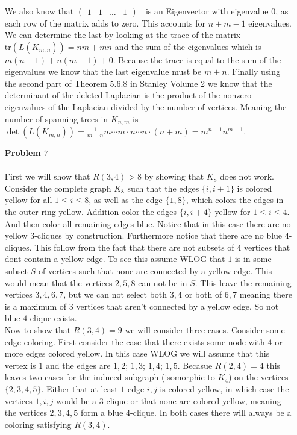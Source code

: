 \documentclass[12pt]{amsart}
\theoremstyle{definition}
\begin{document}
\begin{itemize}[align=left]
We also know that $\begin{pmatrix} 1&1& \dots&1 \end{pmatrix}^\intercal$ is an Eigenvector with eigenvalue $0$, as each row of the matrix adds to zero. This accounts for $n+m-1$ eigenvalues. We can determine the last by looking at the trace of the matrix $\text{tr}( L(K_{m,n}))=nm+mn$ and the sum of the eigenvalues which is $m(n-1)+n(m-1)+0$. Because the trace is equal to the sum of the eigenvalues we know that the last eigenvalue must be $m+n$. Finally using the second part of Theorem 5.6.8 in Stanley Volume 2 we know that the determinant of the deleted Laplacian is the product of the nonzero eigenvalues of the Laplacian divided by the number of vertices. Meaning the number of spanning trees in $K_{n,m}$ is $\det(L(K_{m,n}))=\frac{1}{m+n}m\cdots m\cdot n\cdots n\cdot (n+m)=m^{n-1}n^{m-1}$.\\
    

\item[\textbf{Problem $7$}]\;\\\\ %
First we will show that $R(3,4)>8$ by showing that $K_8$ does not work. Consider the complete graph $K_8$ such that the edges $\{i,i+1\}$ is colored yellow for all $1\leq i\leq 8$, as well as the edge $\{1,8\}$, which colors the edges in the outer ring yellow. Addition color the edges $\{i,i+4\}$ yellow for $1\leq i\leq 4$. And then color all remaining edges blue. Notice that in this case there are no yellow $3$-cliques by construction. Furthermore notice that there are no blue $4$-cliques. This follow from the fact that there are not subsets of $4$ vertices that dont contain a yellow edge. To see this assume WLOG that $1$ is in some subset $S$ of vertices such that none are connected by a yellow edge. This would mean that the vertices $2,5,8$ can not be in $S$. This leave the remaining vertices $3,4,6,7$, but we can not select both $3,4$ or both of $6,7$ meaning there is a maximum of $3$ vertices that aren't connected by a yellow edge. So not blue $4$-clique exists.\\

Now to show that $R(3,4)=9$ we will consider three cases. Consider some edge coloring. First consider the case that there exists some node with $4$ or more edges colored yellow. In this case WLOG we will assume that this vertex is $1$ and the edges are $1,2$; $1,3$; $1,4$; $1,5$. Becasue $R(2,4)=4$ this leaves two cases for the induced subgraph (isomorphic to $K_4$) on the vertices $\{2,3,4,5\}$. Either that at least $1$ edge $i,j$ is colored yellow, in which case the vertices $1,i,j$ would be a $3$-clique or that none are colored yellow, meaning the vertices $2,3,4,5$ form a blue $4$-clique. In both cases there will always be a coloring satisfying $R(3,4)$.\\


\end{itemize}
\end{document}
